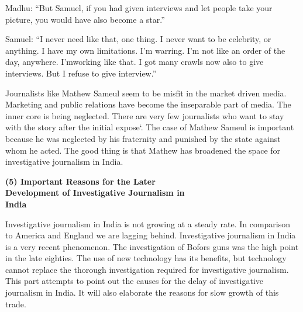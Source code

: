\begin{multicols}{2}
\vspace{-.15cm}

\noi
Madhu: “But Samuel, if you had given interviews and let people take your picture, you would
have also become a star.”

\vspace{-.15cm}

\noi
Samuel: “I never need like that, one thing. I never want to be celebrity, or anything. I have my
own limitations. I’m warring. I’m not like an order of the day, anywhere. I’mworking like that.
I got many crawls now also to give interviews. But I refuse to give interview.”

\vspace{-.15cm}

\noi
Journalists like Mathew Sameul seem to be misfit in the market driven media. Marketing and
public relations have become the inseparable part of media. The inner core is being neglected.
There are very few journalists who want to stay with the story after the initial expose`. The
case of Mathew Sameul is important because he was neglected by his fraternity and punished
by the state against whom he acted. The good thing is that Mathew has broadened the space for
investigative journalism in India.

\vspace{-.15cm}

\noi
{\large \bfseries (5) Important Reasons for the Later\\ Development of Investigative Journalism in\\ India}

\vspace{-.15cm}

\noi
Investigative journalism in India is not growing at a steady rate. In comparison to America and
England we are lagging behind. Investigative journalism in India is a very recent phenomenon.
The investigation of Bofors guns was the high point in the late eighties. The use of new
technology has its benefits, but technology cannot replace the thorough investigation required
for investigative journalism. This part attempts to point out the causes for the delay of
investigative journalism in India. It will also elaborate the reasons for slow growth of this trade.

\vspace{.1cm}



\end{multicols}
